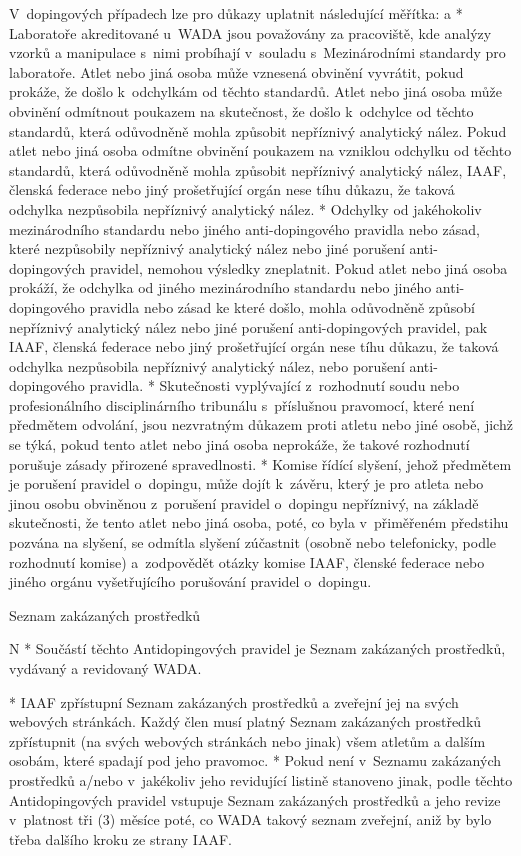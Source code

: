 V~dopingových případech lze pro důkazy uplatnit následující měřítka:
  \begitems \style a
  * Laboratoře akreditované u~WADA jsou považovány za pracoviště, kde analýzy vzorků a manipulace s~nimi probíhají v~souladu s~Mezinárodními standardy pro laboratoře. Atlet nebo jiná osoba může vznesená obvinění vyvrátit, pokud prokáže, že došlo k~odchylkám od těchto standardů. Atlet nebo jiná osoba může obvinění odmítnout poukazem na skutečnost, že došlo k~odchylce od těchto standardů, která odůvodněně mohla způsobit nepříznivý analytický nález.
    Pokud atlet nebo jiná osoba odmítne obvinění poukazem na vzniklou odchylku od těchto standardů, která odůvodněně mohla způsobit nepříznivý analytický nález, IAAF, členská federace nebo jiný prošetřující orgán nese tíhu důkazu, že taková odchylka nezpůsobila nepříznivý analytický nález.
  * Odchylky od jakéhokoliv mezinárodního standardu nebo jiného anti-dopingového pravidla nebo zásad, které nezpůsobily nepříznivý analytický nález nebo jiné porušení anti-dopingových pravidel, nemohou výsledky zneplatnit. Pokud atlet nebo jiná osoba prokáží, že odchylka od jiného mezinárodního standardu nebo jiného anti-dopingového pravidla nebo zásad ke které došlo, mohla odůvodněně způsobí nepříznivý analytický nález nebo jiné porušení anti-dopingových pravidel, pak IAAF, členská federace nebo jiný prošetřující orgán nese tíhu důkazu, že taková odchylka nezpůsobila nepříznivý analytický nález, nebo porušení anti-dopingového pravidla.
  * Skutečnosti vyplývající z~rozhodnutí soudu nebo profesionálního disciplinárního tribunálu s~příslušnou pravomocí, které není předmětem odvolání, jsou nezvratným důkazem proti atletu nebo jiné osobě, jichž se týká, pokud tento atlet nebo jiná osoba neprokáže, že takové rozhodnutí porušuje zásady přirozené spravedlnosti.
  * Komise řídící slyšení, jehož předmětem je porušení pravidel o~dopingu, může dojít k~závěru, který je pro atleta nebo jinou osobu obviněnou z~porušení pravidel o~dopingu nepříznivý, na základě skutečnosti, že tento atlet nebo jiná osoba, poté, co byla v~přiměřeném předstihu pozvána na slyšení, se odmítla slyšení zúčastnit (osobně nebo telefonicky, podle rozhodnutí komise) a~zodpovědět otázky komise IAAF, členské federace nebo jiného orgánu vyšetřujícího porušování pravidel o~dopingu.
  \enditems
\enditems

\secc Seznam zakázaných prostředků

\begitems \style N
* Součástí těchto Antidopingových pravidel je Seznam zakázaných prostředků, vydávaný a revidovaný WADA.

* IAAF zpřístupní Seznam zakázaných prostředků a zveřejní jej na svých webových stránkách. Každý člen musí platný Seznam zakázaných prostředků zpřístupnit (na svých webových stránkách nebo jinak) všem atletům a dalším osobám, které spadají pod jeho pravomoc.
* Pokud není v~Seznamu zakázaných prostředků a/nebo v~jakékoliv jeho revidující listině stanoveno jinak, podle těchto Antidopingových pravidel vstupuje Seznam zakázaných prostředků a jeho revize v~platnost tři (3) měsíce poté, co WADA takový seznam zveřejní, aniž by bylo třeba dalšího kroku ze strany IAAF.

